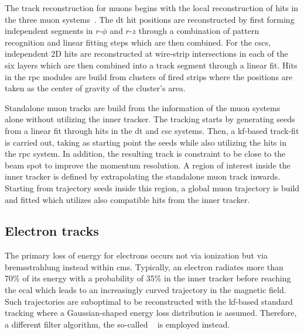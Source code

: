 The track reconstruction for muons begins with the local reconstruction of hits in the three muon systems~\cite{Bayatian:922757}. The \gls{dt} hit positions are reconstructed by first forming independent segments in $r\text{-}\phi$ and $r\text{-}z$ through a combination of pattern recognition and linear fitting steps which are then combined. For the \glspl{csc}, independent 2D hits are reconstructed at wire-strip intersections in each of the six layers which are then combined into a track segment through a linear fit. Hits in the \gls{rpc} modules are build from clusters of fired strips where the positions are taken as the center of gravity of the cluster's area.

Standalone muon tracks are build from the information of the muon systems alone without utilizing the inner tracker. The tracking starts by generating seeds from a linear fit through hits in the \gls{dt} and \gls{csc} systems. Then, a \gls{kf}-based track-fit is carried out, taking as starting point the seeds while also utilizing the hits in the \gls{rpc} system. In addition, the resulting track is constraint to be close to the beam spot to improve the momentum resolution. A region of interest inside the inner tracker is defined by extrapolating the standalone muon track inwards. Starting from trajectory seeds inside this region, a global muon trajectory is build and fitted which utilizes also compatible hits from the inner tracker.


\subsection{Electron tracks}
\label{sec:reconstruction-electrontracks}

The primary loss of energy for electrons occurs not via ionization but via bremsstrahlung instead within \gls{cms}. Typically, an electron radiates more than 70\% of its energy with a probability of 35\% in the inner tracker before reaching the \gls{ecal} which leads to an increasingly curved trajectory in the magnetic field. Such trajectories are suboptimal to be reconstructed with the \gls{kf}-based standard tracking where a Gaussian-shaped energy loss distribution is assumed. Therefore, a different filter algorithm, the so-called ~\cite{0954-3899-31-9-N01} is employed instead.

